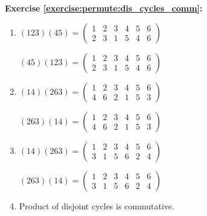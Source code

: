 \noindent\textbf{Exercise \ref{exercise:permute:dis_cycles_comm}:}
\begin{multicols}{2}
\begin{enumerate}[{a.}]
\item
$(123)(45) = \begin{pmatrix}
1 & 2 & 3 & 4 & 5 & 6\\
2 & 3 & 1 & 5 & 4 & 6
\end{pmatrix}$

$(45)(123) = \begin{pmatrix}
1 & 2 & 3 & 4 & 5 & 6\\
2 & 3 & 1 & 5 & 4 & 6
\end{pmatrix}$

\item
$(14)(263) = \begin{pmatrix}
1 & 2 & 3 & 4 & 5 & 6\\
4 & 6 & 2 & 1 & 5 & 3
\end{pmatrix}$

$(263)(14) = \begin{pmatrix}
1 & 2 & 3 & 4 & 5 & 6\\
4 & 6 & 2 & 1 & 5 & 3
\end{pmatrix}$

\item
$(14)(263) = \begin{pmatrix}
1 & 2 & 3 & 4 & 5 & 6\\
3 & 1 & 5 & 6 & 2 & 4
\end{pmatrix}$

$(263)(14) = \begin{pmatrix}
1 & 2 & 3 & 4 & 5 & 6\\
3 & 1 & 5 & 6 & 2 & 4
\end{pmatrix}$


\item
Product of disjoint cycles is commutative.
\end{enumerate}
\end{multicols}

